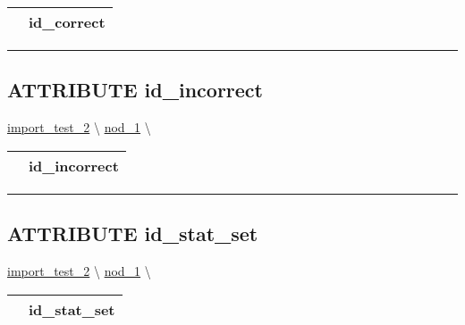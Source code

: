 {\renewcommand{\arraystretch}{1.5}
\begin{tabularx}{\textwidth}{|>{\raggedright\arraybackslash}l|X|}
\hline
\hspace{0pt}\mytexttt{\color{red} } & \textbf{id\_correct} \\
\hline
\end{tabularx}
}

\par


\rule{\linewidth}{0.5pt}
\subsection*{\textsf{\colorbox{headtoc}{\color{white} ATTRIBUTE}
id\_incorrect}}

\hypertarget{ecldoc:constants.id_incorrect}{}
\hspace{0pt} \hyperlink{ecldoc:import_test_2}{import_test_2} \textbackslash 
\hspace{0pt} \hyperlink{ecldoc:Constants}{nod_1} \textbackslash 

{\renewcommand{\arraystretch}{1.5}
\begin{tabularx}{\textwidth}{|>{\raggedright\arraybackslash}l|X|}
\hline
\hspace{0pt}\mytexttt{\color{red} } & \textbf{id\_incorrect} \\
\hline
\end{tabularx}
}

\par


\rule{\linewidth}{0.5pt}
\subsection*{\textsf{\colorbox{headtoc}{\color{white} ATTRIBUTE}
id\_stat\_set}}

\hypertarget{ecldoc:constants.id_stat_set}{}
\hspace{0pt} \hyperlink{ecldoc:import_test_2}{import_test_2} \textbackslash 
\hspace{0pt} \hyperlink{ecldoc:Constants}{nod_1} \textbackslash 

{\renewcommand{\arraystretch}{1.5}
\begin{tabularx}{\textwidth}{|>{\raggedright\arraybackslash}l|X|}
\hline
\hspace{0pt}\mytexttt{\color{red} } & \textbf{id\_stat\_set} \\
\hline
\end{tabularx}
}

\par



